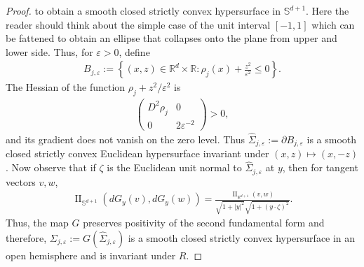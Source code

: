 \documentclass[10pt,a4paper]{amsart}
\def\bR {\mathbb{R}}
\def\bS {\mathbb{S}}
\newcommand{\veps}{\varepsilon}
\begin{document}
\begin{proof}
to obtain a smooth closed strictly convex hypersurface in $\bS^{d+1}$. Here the reader should think about the simple case of the unit interval $[-1,1]$ which can be fattened to obtain an ellipse that collapses onto the plane from upper and lower side. Thus, for $\varepsilon>0$, define
\begin{align}
        B_{j,\varepsilon}
        :=
        \left\{
        (x,z)\in\bR^d\times\bR:
        \rho_j(x)+\frac{z^2}{\varepsilon^2}\leq0
        \right\}.
\end{align}
The Hessian of the function $\rho_j+z^2/\veps^2$ is
\begin{align}
        \begin{pmatrix}
        D^2\rho_j&0\\
        0&2\varepsilon^{-2}
        \end{pmatrix}
        >
        0,
\end{align}
and its gradient does not vanish on the zero level. Thus
$\widehat\Sigma_{j,\varepsilon}:=\partial B_{j,\varepsilon}$ is a smooth
closed strictly convex Euclidean hypersurface invariant under
$(x,z)\mapsto(x,-z)$. Now observe that if $\zeta$ is the Euclidean unit normal to
$\widehat\Sigma_{j,\varepsilon}$ at $y$, then for tangent vectors $v,w$,
\begin{align}
        \operatorname{II}_{\bS^{d+1}}(dG_y(v),dG_y(w))
        =
        \frac{
        \operatorname{II}_{\bR^{d+1}}(v,w)
        }{
        \sqrt{1+|y|^2}
        \sqrt{1+(y\cdot\zeta)^2}
        }.
\end{align}
Thus, the map $G$ preserves positivity of the second fundamental form and therefore, $\Sigma_{j,\varepsilon} := G(\widehat\Sigma_{j,\varepsilon})$ is a smooth closed strictly convex hypersurface in an open hemisphere and is
invariant under $R$.


\end{proof}
\end{document}
